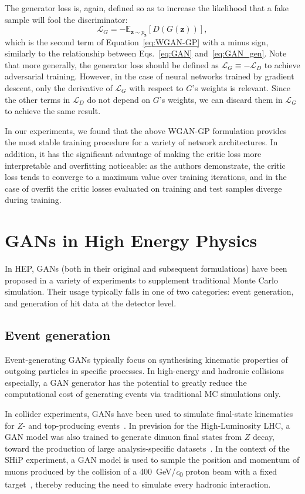 The generator loss is, again, defined so as to increase the likelihood that a
fake sample will fool the discriminator:
\begin{equation}\label{eq:WGAN-GP_gen}
    \mathcal{L}_G =
    -\mathbb{E}_{\bm{z} \sim p_{\bm{z}}} \left[ D(G(\bm{z})) \right],
\end{equation}
which is the second term of Equation~\ref{eq:WGAN-GP} with a minus sign, similarly to
the relationship between Eqs.~\ref{eq:GAN} and~\ref{eq:GAN_gen}. Note that more
generally, the generator loss should be defined as $\mathcal{L}_G \equiv
-\mathcal{L}_D$ to achieve adversarial training. However, in the case of neural
networks trained by gradient descent, only the derivative of $\mathcal{L}_G$
with respect to $G$'s weights is relevant. Since the other terms in
$\mathcal{L}_D$ do not depend on $G$'s weights, we can discard them in
$\mathcal{L}_G$ to achieve the same result.

In our experiments, we found that the above WGAN-GP formulation provides the
most stable training procedure for a variety of network architectures. In
addition, it has the significant advantage of making the critic loss more
interpretable and overfitting noticeable: as the authors demonstrate, the critic
loss tends to converge to a maximum value over training iterations, and in the
case of overfit the critic losses evaluated on training and test samples
diverge during training.

\section{GANs in High Energy Physics}
In HEP, GANs (both in their original and subsequent formulations) have been
proposed in a variety of experiments to supplement traditional Monte Carlo
simulation. Their usage typically falls in one of two categories: event
generation, and generation of hit data at the detector level.

\subsection{Event generation}
Event-generating GANs typically focus on synthesising kinematic properties of
outgoing particles in specific processes. In high-energy and hadronic collisions
especially, a GAN generator has the potential to greatly reduce the
computational cost of generating events via traditional MC simulations only.

In collider experiments, GANs have been used to simulate final-state kinematics
for $Z$- and top-producing events~\cite{butter_how_2019, otten_event_2019}. In
prevision for the High-Luminosity LHC, a GAN model was also trained to generate
dimuon final states from $Z$ decay, toward the production of large
analysis-specific datasets~\cite{hashemi2019lhc}. In the context of the SHiP
experiment, a GAN model is used to sample the position and momentum of muons
produced by the collision of a \SI{400}{\GeV/\clight} proton beam with a fixed
target~\cite{ahdida_fast_2019}, thereby reducing the need to simulate every
hadronic interaction.



